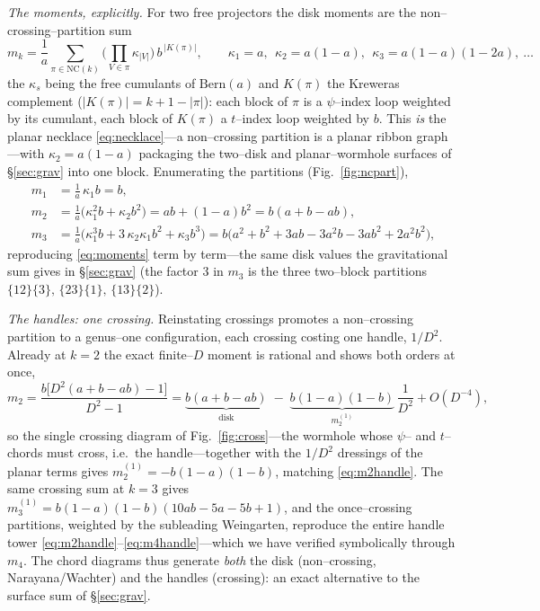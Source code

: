 \documentclass[11pt]{article}
\newcommand{\Bern}{\mathrm{Bern}}
\begin{document}
\smallskip\noindent\emph{The moments, explicitly.} For two free projectors the disk moments are the
non--crossing--partition sum
\begin{equation}
  m_k=\frac1a\sum_{\pi\in\mathrm{NC}(k)}\Big(\prod_{V\in\pi}\kappa_{|V|}\Big)\,b^{\,|K(\pi)|},
  \qquad \kappa_1=a,\ \ \kappa_2=a(1{-}a),\ \ \kappa_3=a(1{-}a)(1{-}2a),\ \dots
  \label{eq:ncmoments}
\end{equation}
the $\kappa_s$ being the free cumulants of $\Bern(a)$ and $K(\pi)$ the Kreweras complement
($|K(\pi)|=k{+}1{-}|\pi|$): each block of $\pi$ is a $\psi$--index loop weighted by its cumulant, each
block of $K(\pi)$ a $t$--index loop weighted by $b$. This \emph{is} the planar necklace
\eqref{eq:necklace}---a non--crossing partition is a planar ribbon graph---with $\kappa_2=a(1{-}a)$
packaging the two--disk and planar--wormhole surfaces of \S\ref{sec:grav} into one block. Enumerating
the partitions (Fig.~\ref{fig:ncpart}),
\begin{align*}
  m_1&=\tfrac1a\,\kappa_1 b=b,\\
  m_2&=\tfrac1a\big(\kappa_1^2 b+\kappa_2 b^2\big)=ab+(1{-}a)b^2=b(a+b-ab),\\
  m_3&=\tfrac1a\big(\kappa_1^3 b+3\,\kappa_2\kappa_1 b^2+\kappa_3 b^3\big)
      =b\big(a^2+b^2+3ab-3a^2b-3ab^2+2a^2b^2\big),
\end{align*}
reproducing \eqref{eq:moments} term by term---the same disk values the gravitational sum gives in
\S\ref{sec:grav} (the factor $3$ in $m_3$ is the three two--block partitions
$\{12\}\{3\},\,\{23\}\{1\},\,\{13\}\{2\}$).

\smallskip\noindent\emph{The handles: one crossing.} Reinstating crossings promotes a non--crossing
partition to a genus--one configuration, each crossing costing one handle, $1/D^2$. Already at $k=2$
the exact finite--$D$ moment is rational and shows both orders at once,
\begin{equation}
  m_2=\frac{b\big[D^2(a+b-ab)-1\big]}{D^2-1}
     =\underbrace{b(a+b-ab)}_{\text{disk}}\;-\;\underbrace{b(1-a)(1-b)}_{m_2^{(1)}}\,\frac1{D^2}+O(D^{-4}),
  \label{eq:m2exact}
\end{equation}
so the single crossing diagram of Fig.~\ref{fig:cross}---the wormhole whose $\psi$-- and $t$--chords
must cross, i.e.\ the handle---together with the $1/D^2$ dressings of the planar terms gives
$m_2^{(1)}=-b(1-a)(1-b)$, matching \eqref{eq:m2handle}. The same crossing sum at $k=3$ gives
$m_3^{(1)}=b(1-a)(1-b)(10ab-5a-5b+1)$, and the once--crossing partitions, weighted by the subleading
Weingarten, reproduce the entire handle tower \eqref{eq:m2handle}--\eqref{eq:m4handle}---which we have
verified symbolically through $m_4$. The chord diagrams thus generate \emph{both} the disk
(non--crossing, Narayana/Wachter) and the handles (crossing): an exact alternative to the surface sum
of \S\ref{sec:grav}.
\end{document}
